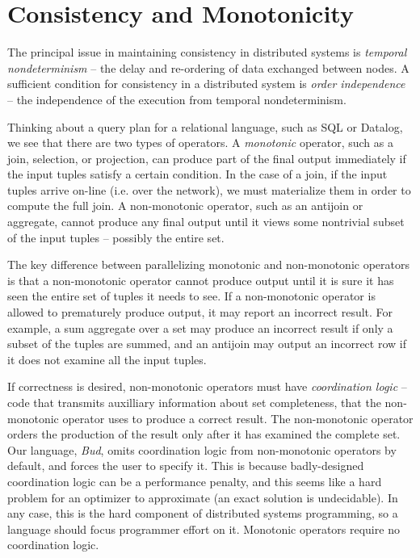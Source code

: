 \section{Consistency and Monotonicity}

The principal issue in maintaining consistency in distributed systems is {\em
temporal nondeterminism} -- the delay and re-ordering of data exchanged between
nodes.  A sufficient condition for consistency in a distributed system is {\em
order independence} -- the independence of the execution from temporal
nondeterminism.


Thinking about a query plan for a relational language, such as SQL or Datalog,
we see that there are two types of operators.  A {\em monotonic} operator, such
as a join, selection, or projection, can produce part of the final output
immediately if the input tuples satisfy a certain condition.  In the case of a
join, if the input tuples arrive on-line (i.e. over the network), we must
materialize them in order to compute the full join.  A non-monotonic operator,
such as an antijoin or aggregate, cannot produce any final output until it
views some nontrivial subset of the input tuples -- possibly the entire set.

The key difference between parallelizing monotonic and non-monotonic operators
is that a non-monotonic operator cannot produce output until it is sure it has
seen the entire set of tuples it needs to see.  If a non-monotonic operator is
allowed to prematurely produce output, it may report an incorrect result.  For
example, a sum aggregate over a set may produce an incorrect result if only a
subset of the tuples are summed, and an antijoin may output an incorrect row if
it does not examine all the input tuples.

If correctness is desired, non-monotonic operators must have {\em coordination
logic} -- code that transmits auxilliary information about set completeness,
that the non-monotonic operator uses to produce a correct result.  The
non-monotonic operator orders the production of the result only after it has
examined the complete set.  Our language, {\em Bud}, omits coordination logic
from non-monotonic operators by default, and forces the user to specify it.
This is because badly-designed coordination logic can be a performance penalty,
and this seems like a hard problem for an optimizer to approximate (an exact
solution is undecidable).  In any case, this is the hard component of
distributed systems programming, so a language should focus programmer effort
on it.  Monotonic operators require no coordination logic.

